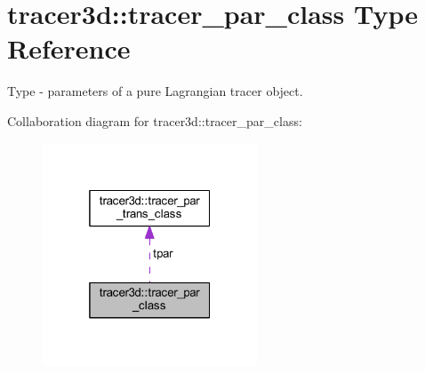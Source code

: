 \hypertarget{structtracer3d_1_1tracer__par__class}{}\section{tracer3d\+:\+:tracer\+\_\+par\+\_\+class Type Reference}
\label{structtracer3d_1_1tracer__par__class}


Type -\/ parameters of a pure Lagrangian tracer object.  




Collaboration diagram for tracer3d\+:\+:tracer\+\_\+par\+\_\+class\+:\nopagebreak
\begin{figure}[H]
\begin{center}
\leavevmode
\includegraphics[width=181pt]{structtracer3d_1_1tracer__par__class__coll__graph}
\end{center}
\end{figure}
